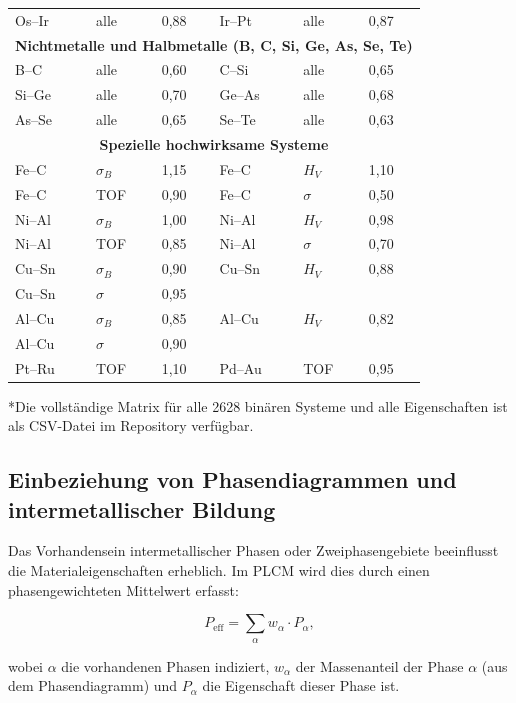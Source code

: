 \documentclass[12pt,a4paper]{article}
\begin{document}
\begin{longtable}{p{1.5cm}p{1.5cm}p{1.2cm}p{1.2cm}p{1.2cm}p{1.2cm}}
	Os–Ir & alle & 0,88 & Ir–Pt & alle & 0,87 \\
	\multicolumn{6}{c}{\textbf{Nichtmetalle und Halbmetalle (B, C, Si, Ge, As, Se, Te)}} \\
	B–C  & alle & 0,60 & C–Si  & alle & 0,65 \\
	Si–Ge & alle & 0,70 & Ge–As & alle & 0,68 \\
	As–Se & alle & 0,65 & Se–Te & alle & 0,63 \\
	\multicolumn{6}{c}{\textbf{Spezielle hochwirksame Systeme}} \\
	Fe–C  & \(\sigma_B\) & 1,15 & Fe–C  & \(H_V\) & 1,10 \\
	Fe–C  & TOF & 0,90 & Fe–C  & \(\sigma\) & 0,50 \\
	Ni–Al & \(\sigma_B\) & 1,00 & Ni–Al & \(H_V\) & 0,98 \\
	Ni–Al & TOF & 0,85 & Ni–Al & \(\sigma\) & 0,70 \\
	Cu–Sn & \(\sigma_B\) & 0,90 & Cu–Sn & \(H_V\) & 0,88 \\
	Cu–Sn & \(\sigma\) & 0,95 & & & \\
	Al–Cu & \(\sigma_B\) & 0,85 & Al–Cu & \(H_V\) & 0,82 \\
	Al–Cu & \(\sigma\) & 0,90 & & & \\
	Pt–Ru & TOF & 1,10 & Pd–Au & TOF & 0,95 \\
	\bottomrule
\end{longtable}
*Die vollständige Matrix für alle 2628 binären Systeme und alle Eigenschaften ist als CSV-Datei im Repository verfügbar.

\subsection{Einbeziehung von Phasendiagrammen und intermetallischer Bildung}
\label{subsec:phase-diagrams}

Das Vorhandensein intermetallischer Phasen oder Zweiphasengebiete beeinflusst die Materialeigenschaften erheblich. Im PLCM wird dies durch einen phasengewichteten Mittelwert erfasst:

\begin{equation}
	P_{\text{eff}} = \sum_{\alpha} w_{\alpha} \cdot P_{\alpha},
	\label{eq:phase-weighted}
\end{equation}

wobei \(\alpha\) die vorhandenen Phasen indiziert, \(w_{\alpha}\) der Massenanteil der Phase \(\alpha\) (aus dem Phasendiagramm) und \(P_{\alpha}\) die Eigenschaft dieser Phase ist.
\end{document}

